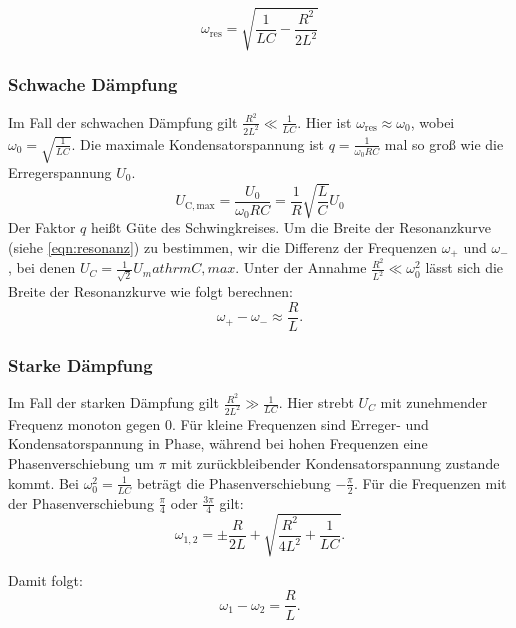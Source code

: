 \begin{equation}
  \omega_\mathrm{res} = \sqrt{\frac{1}{LC} - \frac{R^2}{2L^2}}
\end{equation}

\subsubsection*{Schwache Dämpfung}
Im Fall der schwachen Dämpfung gilt $\frac{R^2}{2L^2} \ll \frac{1}{LC}$. Hier ist $\omega_\mathrm{res} \approx \omega_0$, wobei $\omega_0 = \sqrt{\frac{1}{LC}}$.
Die maximale Kondensatorspannung ist $q = \frac{1}{\omega_0 RC}$ mal so groß wie die Erregerspannung $U_0$.
\begin{equation}
  U_\mathrm{C, max} = \frac{U_0}{\omega_0 RC} = \frac{1}{R}\sqrt{\frac{L}{C}}U_0
\end{equation}
 Der Faktor $q$ heißt Güte des Schwingkreises. Um die Breite der Resonanzkurve (siehe \ref{eqn:resonanz}) zu bestimmen, wir die Differenz der Frequenzen $\omega_+$ und $\omega_-$, bei denen $U_C = \frac{1}{\sqrt{2}} U_mathrm{C, max}$.
Unter der Annahme $\frac{R^2}{L^2} \ll \omega_0^2$ lässt sich die Breite der Resonanzkurve wie folgt berechnen:
\begin{equation}
  \omega_+ - \omega_- \approx \frac{R}{L}.
\end{equation}

\subsubsection*{Starke Dämpfung}
Im Fall der starken Dämpfung gilt $\frac{R^2}{2L^2} \gg \frac{1}{LC}$. Hier strebt $U_C$ mit zunehmender Frequenz monoton gegen 0.
Für kleine Frequenzen sind Erreger- und Kondensatorspannung in Phase, während bei hohen Frequenzen eine Phasenverschiebung um $\pi$ mit zurückbleibender Kondensatorspannung zustande kommt. Bei $\omega_0^2 = \frac{1}{LC}$ beträgt die Phasenverschiebung $-\frac{\pi}{2}$.
Für die Frequenzen mit der Phasenverschiebung $\frac{\pi}{4}$ oder $\frac{3\pi}{4}$ gilt:
\begin{equation}
  \omega_\mathrm{1,2} = \pm \frac{R}{2L} + \sqrt{\frac{R^2}{4L^2} + \frac{1}{LC}}.
\end{equation}

Damit folgt:
\begin{equation}
  \omega_{1} - \omega_{2} = \frac{R}{L}.
\end{equation}
